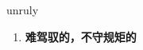 
\begin{frame}
{\huge unruly}
\begin{center}
\begin{enumerate}\Large
  \item \textbf{难驾驭的，不守规矩的}
\end{enumerate}
\end{center}
\end{frame}
